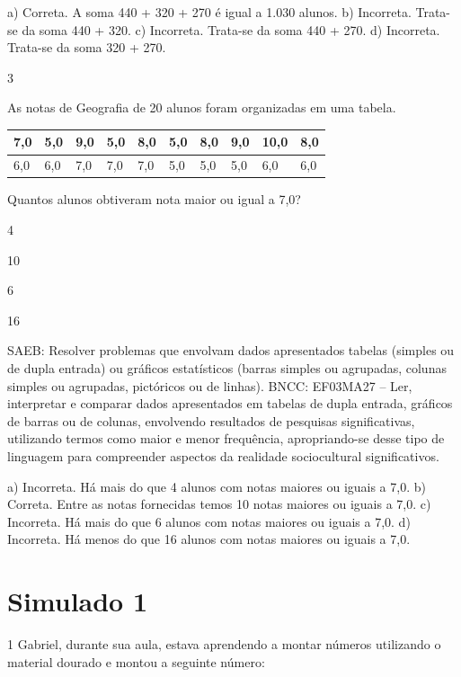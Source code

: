 {\begin{escolha}
{a) Correta.  A soma 440 + 320 + 270 é igual a 1.030 alunos.
b) Incorreta. Trata-se da soma 440 + 320.
c) Incorreta. Trata-se da soma 440 + 270.
d) Incorreta. Trata-se da soma 320 + 270.

\num{3}

As notas de Geografia de 20 alunos foram organizadas em uma tabela.

\begin{longtable}[]{@{}llllllllll@{}}
\toprule
7,0 & 5,0 & 9,0 & 5,0 & 8,0 & 5,0 & 8,0 & 9,0 & 10,0 &
8,0\tabularnewline
\midrule
\endhead
6,0 & 6,0 & 7,0 & 7,0 & 7,0 & 5,0 & 5,0 & 5,0 & 6,0 & 6,0\tabularnewline
\bottomrule
\end{longtable}

Quantos alunos obtiveram nota maior ou igual a 7,0?

\begin{escolha}
\item
  4
\item
  10
\item
  6
\item
  16
\end{escolha}

SAEB: Resolver problemas que envolvam dados apresentados tabelas (simples ou de dupla entrada) ou gráficos estatísticos (barras simples ou agrupadas, colunas simples ou agrupadas, pictóricos ou de linhas). 
BNCC: EF03MA27 -- Ler, interpretar e comparar dados apresentados em tabelas de dupla entrada,
gráficos de barras ou de colunas, envolvendo resultados de pesquisas significativas, utilizando
termos como maior e menor frequência, apropriando-se desse tipo de linguagem para
compreender aspectos da realidade sociocultural significativos.

a) Incorreta. Há mais do que 4 alunos com notas maiores ou iguais a 7,0.
b) Correta. Entre as notas fornecidas temos 10 notas maiores ou iguais a 7,0.
c) Incorreta. Há mais do que 6 alunos com notas maiores ou iguais a 7,0.
d) Incorreta. Há menos do que 16 alunos com notas maiores ou iguais a 7,0.


\chapter{Simulado 1}

\num{1} Gabriel, durante sua aula, estava aprendendo a montar números utilizando o
material dourado e montou a seguinte número:


}
\end{escolha}}
